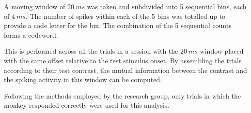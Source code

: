 A moving window of $\SI{20}{ms}$ was taken and subdivided into 5 sequential bins, each of $\SI{4}{ms}$.
The number of spikes within each of the 5 bins was totalled up to provide a code letter for the bin.
The combination of the 5 sequential counts forms a codeword.

This is performed across all the trials in a session with the $\SI{20}{ms}$ window placed with the same offset relative to the test stimulus onset.
By assembling the trials according to their test contrast, the mutual information between the contrast and the spiking activity in this window can be computed.

Following the methods employed by the research group, only trials in which the monkey responded correctly were used for this analysis.

% 




